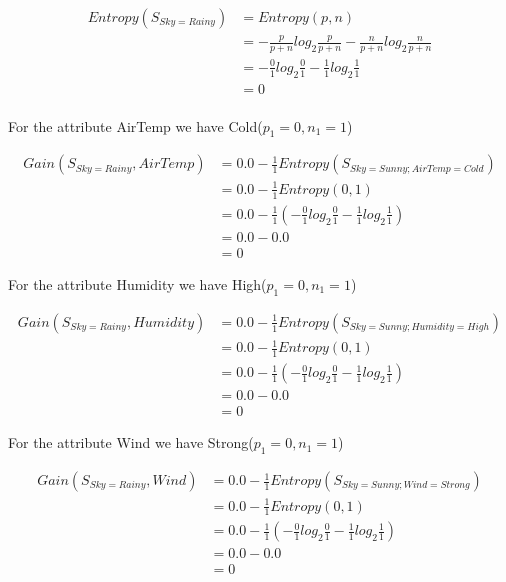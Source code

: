 \documentclass[10pt,a4paper]{article}
\begin{document}
{{{{{{{{{{\begin{equation}
\begin{split}
Entropy(S_{Sky=Rainy}) &= Entropy(p,n) \\
                       &= -\frac{p}{p+n}log_2\frac{p}{p+n} - \frac{n}{p+n}log_2\frac{n}{p+n}  \\
                       &= -\frac{0}{1} log_2\frac{0}{1} -\frac{1}{1} log_2\frac{1}{1} \\
                       &= 0   \\
\end{split}
\end{equation}

For the attribute AirTemp we have Cold($p_1=0,n_1=1$)
 
\begin{equation}
\begin{split}
Gain(S_{Sky=Rainy},AirTemp) &= 0.0 - \frac{1}{1} Entropy(S_{Sky=Sunny;AirTemp=Cold} )\\
          &= 0.0 - \frac{1}{1} Entropy(0,1) \\
          &= 0.0 - \frac{1}{1}( -\frac{0}{1} log_2\frac{0}{1} -\frac{1}{1} log_2\frac{1}{1} ) \\
          &= 0.0 - 0.0  \\
          &= 0
\end{split}
\end{equation}

For the attribute Humidity we have High($p_1=0,n_1=1$)
 
\begin{equation}
\begin{split}
Gain(S_{Sky=Rainy},Humidity) &= 0.0 - \frac{1}{1} Entropy(S_{Sky=Sunny;Humidity=High} )\\
          &= 0.0 - \frac{1}{1} Entropy(0,1) \\
          &= 0.0 - \frac{1}{1}( -\frac{0}{1} log_2\frac{0}{1} -\frac{1}{1} log_2\frac{1}{1} ) \\
          &= 0.0 - 0.0  \\
          &= 0
\end{split}
\end{equation}

For the attribute Wind we have Strong($p_1=0,n_1=1$)
 
\begin{equation}
\begin{split}
Gain(S_{Sky=Rainy},Wind) &= 0.0 - \frac{1}{1} Entropy(S_{Sky=Sunny;Wind=Strong} )\\
          &= 0.0 - \frac{1}{1} Entropy(0,1) \\
          &= 0.0 - \frac{1}{1}( -\frac{0}{1} log_2\frac{0}{1} -\frac{1}{1} log_2\frac{1}{1} ) \\
          &= 0.0 - 0.0  \\
          &= 0
\end{split}
\end{equation}

}}}}}}}}}}
\end{document}
